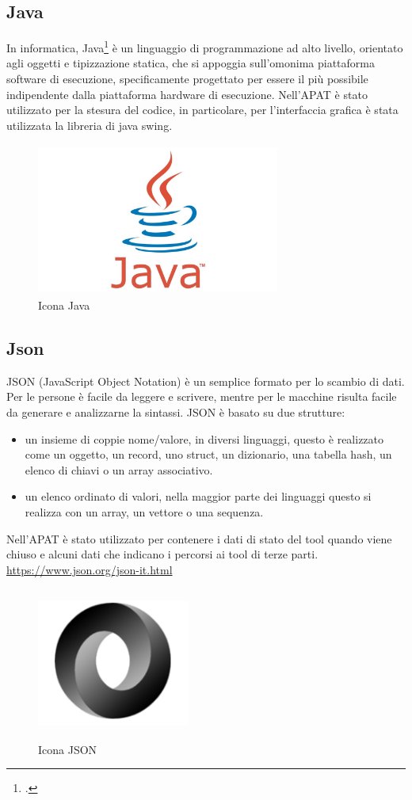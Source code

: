 \subsection*{Java}
In informatica, Java\footcite{womak:effective-java} è un linguaggio di programmazione ad alto livello, orientato agli oggetti e tipizzazione statica, che si appoggia sull'omonima piattaforma software di esecuzione, specificamente progettato per essere il più possibile indipendente dalla piattaforma hardware di esecuzione.
Nell'APAT è stato utilizzato per la stesura del codice, in particolare, per l'interfaccia grafica è stata utilizzata la libreria di java    \gls{swing}.
\begin{figure}[H]
    \centering
    \includegraphics[width=8cm, height=5cm]{./immagini/java.jpg}
    \caption{Icona Java}\label{fig:java}
\end{figure}

\subsection*{Json}
JSON (JavaScript Object Notation) è un semplice formato per lo scambio di dati.
Per le persone è facile da leggere e scrivere, mentre per le macchine risulta facile da generare e analizzarne la sintassi.
JSON è basato su due strutture:
\begin{itemize}
    \item un insieme di coppie nome/valore, in diversi linguaggi, questo è realizzato come un oggetto, un record, uno struct, un dizionario, una tabella hash, un elenco di chiavi o un array associativo.
    \item un elenco ordinato di valori, nella maggior parte dei linguaggi questo si realizza con un array, un vettore o una sequenza.
\end{itemize}
Nell'APAT è stato utilizzato per contenere i dati di stato del tool quando viene chiuso e alcuni dati che indicano i percorsi ai tool di terze parti.
\url{https://www.json.org/json-it.html}
\begin{figure}[H]
    \centering
    \includegraphics[width=5cm, height=5cm]{./immagini/json.png}
    \caption{Icona JSON}\label{fig:json}
\end{figure}

